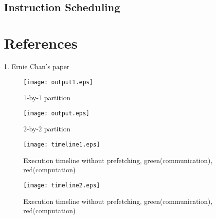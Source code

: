 \documentclass[preprint,11pt]{elsarticle}
\begin{document}
\subsection{Instruction Scheduling}




\section{References}


\cite{lin2010application}
\cite{guyer2004broadway}
\cite{van2009libflame}
\cite{vanlibflame}
\cite{van2008science}



	\renewcommand\refname{\vskip -1cm}
	
	








1. Ernie Chan's paper




\begin{figure}
  \centering
  \texttt{[image: output1.eps]} 
  \caption{1-by-1 partition}
  \label{fig:dep1}
\end{figure}
\begin{figure}
  \centering
  \texttt{[image: output.eps]} 
  \caption{2-by-2 partition}
  \label{fig:dep2}
\end{figure}

\begin{figure}
\begin{minipage} [t] {0.5\textwidth}
  \texttt{[image: timeline1.eps]} 
  \caption{Execution timeline without prefetching, green(communication), red(computation)}
  \label{fig:timeline1}
\end{minipage}
\begin{minipage} [t] {0.5\textwidth}
  \texttt{[image: timeline2.eps]} 
  \caption{Execution timeline without prefetching, green(communication), red(computation)}
  \label{fig:timeline2}
\end{minipage}
\end{figure}
\end{document}
